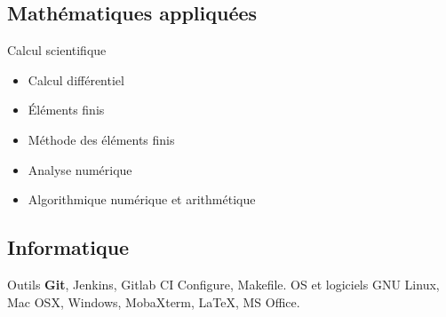 \documentclass[10pt,a4paper,sans]{moderncv}%
\begin{document}
\subsection{Mathématiques appliquées}
{Calcul scientifique}{
    \begin{itemize}
        \item Calcul différentiel
        \item Éléments finis
        \item Méthode des éléments finis
        \item Analyse numérique
        \item Algorithmique numérique et arithmétique
    \end{itemize}
}

\subsection{Informatique}
{Outils}{
    \textbf{Git},
    Jenkins,
    Gitlab CI
    \newline
    Configure,
    Makefile.
}
{OS et logiciels}{
    GNU Linux,
    Mac OSX,
    Windows,
    \newline
    MobaXterm,
    \LaTeX,
    MS Office.
}
\end{document}
